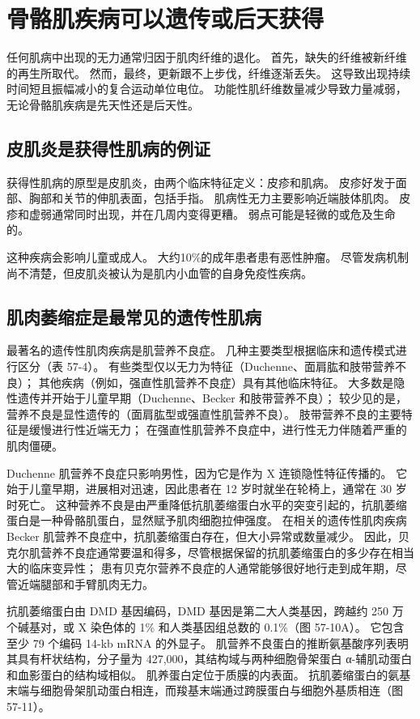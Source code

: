 \section{骨骼肌疾病可以遗传或后天获得}

任何肌病中出现的无力通常归因于肌肉纤维的退化。 首先，缺失的纤维被新纤维的再生所取代。 然而，最终，更新跟不上步伐，纤维逐渐丢失。 这导致出现持续时间短且振幅减小的复合运动单位电位。 功能性肌纤维数量减少导致力量减弱，无论骨骼肌疾病是先天性还是后天性。


\subsection{皮肌炎是获得性肌病的例证}

获得性肌病的原型是皮肌炎，由两个临床特征定义：皮疹和肌病。 皮疹好发于面部、胸部和关节的伸肌表面，包括手指。 肌病性无力主要影响近端肢体肌肉。 皮疹和虚弱通常同时出现，并在几周内变得更糟。 弱点可能是轻微的或危及生命的。

这种疾病会影响儿童或成人。 大约10\%的成年患者患有恶性肿瘤。 尽管发病机制尚不清楚，但皮肌炎被认为是肌内小血管的自身免疫性疾病。


\subsection{肌肉萎缩症是最常见的遗传性肌病}
最著名的遗传性肌肉疾病是肌营养不良症。 几种主要类型根据临床和遗传模式进行区分（表 57-4）。 有些类型仅以无力为特征（Duchenne、面肩肱和肢带营养不良）； 其他疾病（例如，强直性肌营养不良症）具有其他临床特征。 大多数是隐性遗传并开始于儿童早期（Duchenne、Becker 和肢带营养不良）； 较少见的是，营养不良是显性遗传的（面肩肱型或强直性肌营养不良）。 肢带营养不良的主要特征是缓慢进行性近端无力； 在强直性肌营养不良症中，进行性无力伴随着严重的肌肉僵硬。

Duchenne 肌营养不良症只影响男性，因为它是作为 X 连锁隐性特征传播的。 它始于儿童早期，进展相对迅速，因此患者在 12 岁时就坐在轮椅上，通常在 30 岁时死亡。 这种营养不良是由严重降低抗肌萎缩蛋白水平的突变引起的，抗肌萎缩蛋白是一种骨骼肌蛋白，显然赋予肌肉细胞拉伸强度。 在相关的遗传性肌肉疾病 Becker 肌营养不良症中，抗肌萎缩蛋白存在，但大小异常或数量减少。 因此，贝克尔肌营养不良症通常要温和得多，尽管根据保留的抗肌萎缩蛋白的多少存在相当大的临床变异性； 患有贝克尔营养不良症的人通常能够很好地行走到成年期，尽管近端腿部和手臂肌肉无力。

抗肌萎缩蛋白由 DMD 基因编码，DMD 基因是第二大人类基因，跨越约 250 万个碱基对，或 X 染色体的 1\% 和人类基因组总数的 0.1\%（图 57-10A）。 它包含至少 79 个编码 14-kb mRNA 的外显子。 肌营养不良蛋白的推断氨基酸序列表明其具有杆状结构，分子量为 427,000，其结构域与两种细胞骨架蛋白 α-辅肌动蛋白和血影蛋白的结构域相似。 肌养蛋白定位于质膜的内表面。 抗肌萎缩蛋白的氨基末端与细胞骨架肌动蛋白相连，而羧基末端通过跨膜蛋白与细胞外基质相连（图 57-11）。

